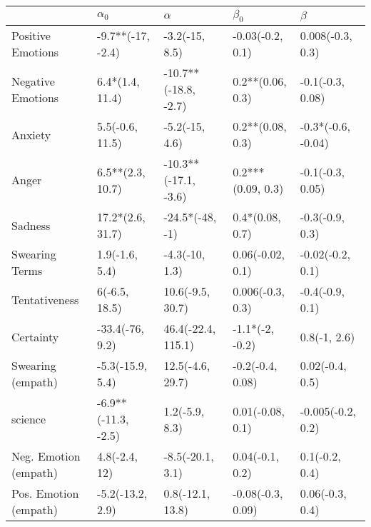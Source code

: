 \begin{tabular}{lllll}
\toprule
{} &           $\alpha_0$ &              $\alpha$ &          $\beta_0$ &             $\beta$ \\
\midrule
Positive Emotions     &    -9.7**(-17, -2.4) &        -3.2(-15, 8.5) &   -0.03(-0.2, 0.1) &    0.008(-0.3, 0.3) \\
Negative Emotions     &      6.4*(1.4, 11.4) &  -10.7**(-18.8, -2.7) &   0.2**(0.06, 0.3) &    -0.1(-0.3, 0.08) \\
Anxiety               &      5.5(-0.6, 11.5) &        -5.2(-15, 4.6) &   0.2**(0.08, 0.3) &  -0.3*(-0.6, -0.04) \\
Anger                 &     6.5**(2.3, 10.7) &  -10.3**(-17.1, -3.6) &  0.2***(0.09, 0.3) &    -0.1(-0.3, 0.05) \\
Sadness               &     17.2*(2.6, 31.7) &       -24.5*(-48, -1) &    0.4*(0.08, 0.7) &     -0.3(-0.9, 0.3) \\
Swearing Terms        &       1.9(-1.6, 5.4) &        -4.3(-10, 1.3) &   0.06(-0.02, 0.1) &    -0.02(-0.2, 0.1) \\
Tentativeness         &        6(-6.5, 18.5) &      10.6(-9.5, 30.7) &   0.006(-0.3, 0.3) &     -0.4(-0.9, 0.1) \\
Certainty             &      -33.4(-76, 9.2) &    46.4(-22.4, 115.1) &    -1.1*(-2, -0.2) &        0.8(-1, 2.6) \\
Swearing (empath)     &     -5.3(-15.9, 5.4) &      12.5(-4.6, 29.7) &   -0.2(-0.4, 0.08) &     0.02(-0.4, 0.5) \\
science               &  -6.9**(-11.3, -2.5) &        1.2(-5.9, 8.3) &   0.01(-0.08, 0.1) &   -0.005(-0.2, 0.2) \\
Neg. Emotion (empath) &        4.8(-2.4, 12) &      -8.5(-20.1, 3.1) &    0.04(-0.1, 0.2) &      0.1(-0.2, 0.4) \\
Pos. Emotion (empath) &     -5.2(-13.2, 2.9) &      0.8(-12.1, 13.8) &  -0.08(-0.3, 0.09) &     0.06(-0.3, 0.4) \\
\bottomrule
\end{tabular}

